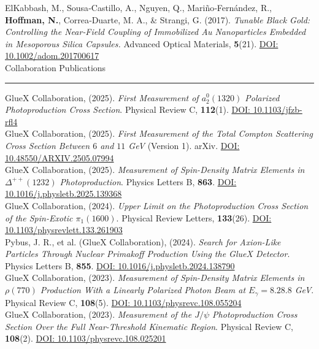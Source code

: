 \documentclass[letterpaper,11pt,oneside]{article}
\newcommand{\sectionheader}[1]{%
{\Large{#1}}
\vspace{2ex}
\hrule
\vspace{2ex}
}
\begin{document}
ElKabbash, M., Sousa‐Castillo, A., Nguyen, Q., Mariño‐Fernández, R., \textbf{Hoffman, N.}, Correa‐Duarte, M. A., \& Strangi, G. (2017). \textit{Tunable Black Gold: Controlling the Near‐Field Coupling of Immobilized Au Nanoparticles Embedded in Mesoporous Silica Capsules.} Advanced Optical Materials, \textbf{5}(21). \href{https://doi.org/10.1002/adom.201700617}{DOI: 10.1002/adom.201700617}\\

\sectionheader{Collaboration Publications}
GlueX Collaboration, (2025). \textit{First Measurement of $a_2^0(1320)$ Polarized Photoproduction Cross Section}. Physical Review C, \textbf{112}(1). \href{https://doi.org/10.1103/jfzb-rfl4}{DOI: 10.1103/jfzb-rfl4}\\

GlueX Collaboration, (2025). \textit{First Measurement of the Total Compton Scattering Cross Section Between $6$ and $11$ GeV} (Version 1). arXiv. \href{https://doi.org/10.48550/ARXIV.2505.07994}{DOI: 10.48550/ARXIV.2505.07994}\\

GlueX Collaboration, (2025). \textit{Measurement of Spin-Density Matrix Elements in $\Delta^{++}(1232)$ Photoproduction}. Physics Letters B, \textbf{863}. \href{https://doi.org/10.1016/j.physletb.2025.139368}{DOI: 10.1016/j.physletb.2025.139368}\\

GlueX Collaboration, (2024). \textit{Upper Limit on the Photoproduction Cross Section of the Spin-Exotic $\pi_1(1600)$}. Physical Review Letters, \textbf{133}(26). \href{https://doi.org/10.1103/physrevlett.133.261903}{DOI: 10.1103/physrevlett.133.261903}\\

Pybus, J. R., et al. (GlueX Collaboration), (2024). \textit{Search for Axion-Like Particles Through Nuclear Primakoff Production Using the GlueX Detector}. Physics Letters B, \textbf{855}. \href{https://doi.org/10.1016/j.physletb.2024.138790}{DOI: 10.1016/j.physletb.2024.138790}\\

GlueX Collaboration, (2023). \textit{Measurement of Spin-Density Matrix Elements in $\rho(770)$ Production With a Linearly Polarized Photon Beam at $E_{\gamma} = 8.2$\textemdash $8.8$ GeV}. Physical Review C, \textbf{108}(5). \href{https://doi.org/10.1103/physrevc.108.055204}{DOI: 10.1103/physrevc.108.055204}\\

GlueX Collaboration, (2023). \textit{Measurement of the $J/\psi$ Photoproduction Cross Section Over the Full Near-Threshold Kinematic Region}. Physical Review C, \textbf{108}(2). \href{https://doi.org/10.1103/physrevc.108.025201}{DOI: 10.1103/physrevc.108.025201}\\
\end{document}

